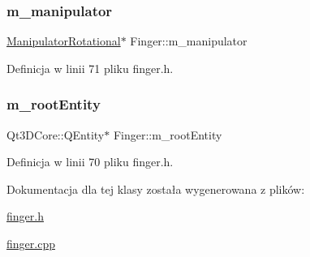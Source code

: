 \mbox{\label{class_finger_a36de3642050edf81b7540fbf6687c9d7}} 
\subsubsection{\texorpdfstring{m\+\_\+manipulator}{m\_manipulator}}
{\footnotesize\ttfamily \hyperlink{class_manipulator_rotational}{Manipulator\+Rotational}$\ast$ Finger\+::m\+\_\+manipulator\hspace{0.3cm}{\ttfamily [protected]}}



Definicja w linii 71 pliku finger.\+h.

\mbox{\label{class_finger_a1c86590c4074a394c323a0d3074c5ade}} 
\subsubsection{\texorpdfstring{m\+\_\+root\+Entity}{m\_rootEntity}}
{\footnotesize\ttfamily Qt3\+D\+Core\+::\+Q\+Entity$\ast$ Finger\+::m\+\_\+root\+Entity\hspace{0.3cm}{\ttfamily [protected]}}



Definicja w linii 70 pliku finger.\+h.



Dokumentacja dla tej klasy została wygenerowana z plików\+:\begin{DoxyCompactItemize}
\item 
\hyperlink{finger_8h}{finger.\+h}\item 
\hyperlink{finger_8cpp}{finger.\+cpp}\end{DoxyCompactItemize}
